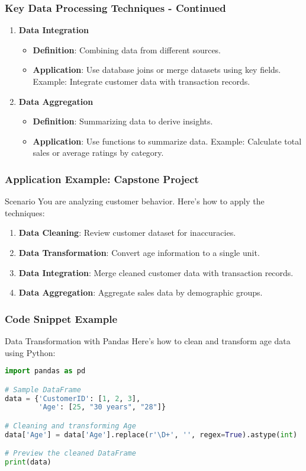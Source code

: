 \documentclass[aspectratio=169]{beamer}
\begin{document}
\begin{frame}
    \frametitle{Key Data Processing Techniques - Continued}
    \begin{enumerate}[resume]
        \item \textbf{Data Integration} 
            \begin{itemize}
                \item \textbf{Definition}: Combining data from different sources.
                \item \textbf{Application}: Use database joins or merge datasets using key fields. Example: Integrate customer data with transaction records.
            \end{itemize}
        \item \textbf{Data Aggregation} 
            \begin{itemize}
                \item \textbf{Definition}: Summarizing data to derive insights.
                \item \textbf{Application}: Use functions to summarize data. Example: Calculate total sales or average ratings by category.
            \end{itemize}
    \end{enumerate}
\end{frame}

\begin{frame}
    \frametitle{Application Example: Capstone Project}
    \begin{block}{Scenario}
        You are analyzing customer behavior. Here’s how to apply the techniques:
    \end{block}
    \begin{enumerate}
        \item \textbf{Data Cleaning}: Review customer dataset for inaccuracies.
        \item \textbf{Data Transformation}: Convert age information to a single unit.
        \item \textbf{Data Integration}: Merge cleaned customer data with transaction records.
        \item \textbf{Data Aggregation}: Aggregate sales data by demographic groups.
    \end{enumerate}
\end{frame}

\begin{frame}[fragile]
    \frametitle{Code Snippet Example}
    \begin{block}{Data Transformation with Pandas}
        Here’s how to clean and transform age data using Python:
    \end{block}
    \begin{lstlisting}[language=Python]
import pandas as pd

# Sample DataFrame
data = {'CustomerID': [1, 2, 3],
        'Age': [25, "30 years", "28"]}

# Cleaning and transforming Age
data['Age'] = data['Age'].replace(r'\D+', '', regex=True).astype(int)

# Preview the cleaned DataFrame
print(data)
    \end{lstlisting}
\end{frame}
\end{document}
